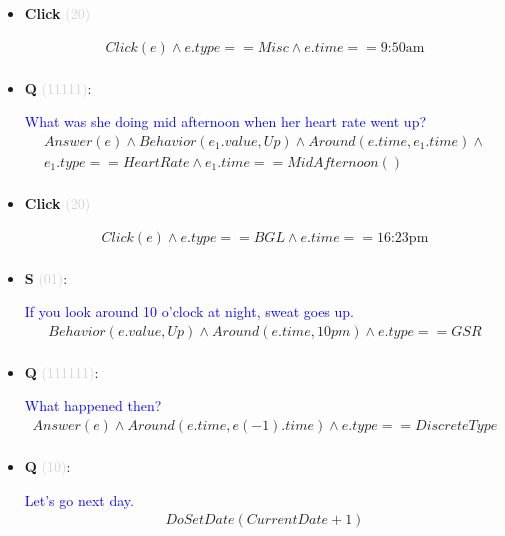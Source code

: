 \documentclass[11pt]{article}
\newcounter{CQ}
\newcounter{CS}
\newcounter{CClick}
\newcommand{\key}[1]{\textcolor{lightgray}{#1}}
\begin{document}
\begin{itemize}
	
	\item
	\textbf{Click\theCClick} \key{(20)} \addtocounter{CClick}{1}
	\begin{multline*}
	Click(e) \wedge e.type == Misc \wedge e.time == \mbox{9:50am}  \\
	\end{multline*}
	
	
	\item
	\textbf{Q\theCQ} \key{(11111)}: \addtocounter{CQ}{1}
	\textcolor{blue}{What was she doing mid afternoon when her heart rate went up? }
	\begin{multline*}
    Answer(e) \wedge Behavior(e_1.value, Up) \wedge Around(e.time, e_1.time) \wedge \\ 
    e_1.type==HeartRate \wedge e_1.time==MidAfternoon() \\
	\end{multline*}
	
	
	
	\item
	\textbf{Click\theCClick} \key{(20)} \addtocounter{CClick}{1}
	\begin{multline*}
	Click(e) \wedge e.type == BGL \wedge e.time == \mbox{16:23pm}  \\
	\end{multline*}
	
	
	\item
	\textbf{S\theCS} \key{(01)}: \addtocounter{CS}{1}
	\textcolor{blue}{ If you look around 10 o'clock at night, sweat goes up. }
	\begin{multline*}
	Behavior(e.value, Up) \wedge Around(e.time, 10pm) \wedge e.type==GSR \\
	\end{multline*}
	
	
	\item
	\textbf{Q\theCQ} \key{(111111)}: \addtocounter{CQ}{1}
	\textcolor{blue}{ What happened then? }
	\begin{multline*}
	Answer(e) \wedge Around(e.time, e(-1).time) \wedge e.type==DiscreteType \\
	\end{multline*}
	
	
	\item
	\textbf{Q\theCQ} \key{(10)}: \addtocounter{CQ}{1}
	\textcolor{blue}{ Let's go next day. }
	\begin{multline*}
	DoSetDate(CurrentDate + 1) \\
	\end{multline*}
	
	
	

\end{itemize}
\end{document}
